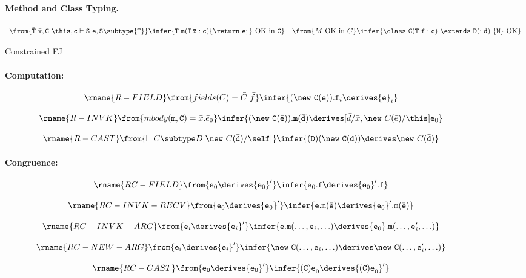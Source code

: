 \begin{figure*}
\paragraph{Method and Class Typing.}
$$
\begin{array}{ll}
\from{ \bar{\tt T}\ \bar{\tt x}, {\tt C}\ \this, {\tt c} \vdash {\tt S}\ {\tt e}, {\tt S} \subtype {\tt T} }   
\infer{\tt T\ m(\bar{\tt T}\,\bar{\tt x} : c)\{\return\ e;\}\ \mbox{OK in}\ C} &
\from{\bar{M}\ \mbox{OK in}\ C}
\infer{\tt \class\ C(\bar{\tt T}\ \bar{\tt f}:c)\ \extends\ D(:d)\ \{\bar{M}\}\ \mbox{OK}} 
\end{array}
$$

\caption{Constrained FJ}\label{FJ-Table}
\end{figure*}

\begin{figure*}
\paragraph{Computation:}

$$
\begin{array}{c}
\rname{{\sc R-FIELD}}
\from{fields(C)=\bar{C}\ \bar{f}}
\infer{(\new\ {\tt C}(\bar{\tt e})).{\tt f}_i \derives {\tt e}_i} \\ \quad\\
\rname{{\sc R-INVK}}
\from{mbody({\tt m},{\tt C})=\bar{x}. \bar{e}_0}
\infer{(\new\ {\tt C}(\bar{\tt e})).{\tt m}(\bar{\tt d}) \derives 
[\bar{d}/\bar{x},\new\ C(\bar{e})/\this]{\tt e}_0} \\ \quad\\
\rname{{\sc R-CAST}}
\from{\vdash C \subtype D[\new\ C(\bar{\tt d})/\self]}
\infer{{\tt (D)(\new\ C(\bar{\tt d}))} \derives \new\ C(\bar{\tt d})}
\end{array}
$$
\paragraph{Congruence:}
$$
\begin{array}{c}
\rname{{\sc RC-FIELD}}
\from{{\tt e}_0 \derives {{\tt e}_0}'}
\infer{{\tt e}_0.{\tt f} \derives {{\tt e}_0}'.{\tt f}} \\ \quad\\
\rname{{\sc RC-INVK-RECV}}
\from{{\tt e}_0 \derives {{\tt e}_0}'}
\infer{{\tt e}.{\tt m}(\bar{\tt e}) \derives {{\tt e}_0}'.{\tt m}(\bar{\tt e})} \\ \quad\\
\rname{{\sc RC-INVK-ARG}}
\from{{\tt e}_i \derives {{\tt e}_i}'}
\infer{{\tt e}.{\tt m}(\ldots,{\tt e}_i,\ldots) \derives {{\tt e}_0}.{\tt m}(\ldots,{\tt e}_i',\ldots)}\\ \quad\\
\rname{{\sc RC-NEW-ARG}}
\from{{\tt e}_i \derives {{\tt e}_i}'}
\infer{\new\ {\tt C}(\ldots,{\tt e}_i,\ldots) \derives \new\ {\tt C}(\ldots,{\tt e}_i',\ldots)} \\ \quad\\
\rname{{\sc RC-CAST}}
\from{{\tt e}_0 \derives {{\tt e}_0}'}
\infer{{\tt (C) e}_0 \derives {{\tt (C) e}_0}'}
\end{array}
$$


\end{figure*}
